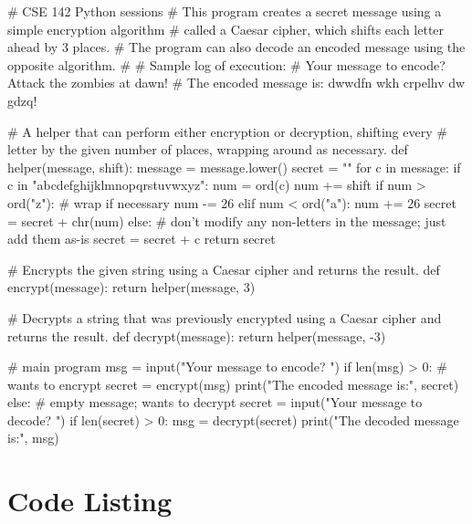 {\scriptsize
\begin{python}
# CSE 142 Python sessions
# This program creates a secret message using a simple encryption algorithm
# called a Caesar cipher, which shifts each letter ahead by 3 places.
# The program can also decode an encoded message using the opposite algorithm.
#
# Sample log of execution:
# Your message to encode? Attack the zombies at dawn!
# The encoded message is: dwwdfn wkh crpelhv dw gdzq!

# A helper that can perform either encryption or decryption, shifting every
# letter by the given number of places, wrapping around as necessary.
def helper(message, shift):
	message = message.lower()
	secret = ""
	for c in message:
		if c in "abcdefghijklmnopqrstuvwxyz":
			num = ord(c)
			num += shift
			if num > ord("z"):     # wrap if necessary
				num -= 26
			elif num < ord("a"):
				num += 26
			secret = secret + chr(num)
		else:
			# don't modify any non-letters in the message; just add them as-is
			secret = secret + c
	return secret

# Encrypts the given string using a Caesar cipher and returns the result.
def encrypt(message):
	return helper(message, 3)

# Decrypts a string that was previously encrypted using a Caesar cipher and returns the result.
def decrypt(message):
	return helper(message, -3)


# main program
msg = input("Your message to encode? ")
if len(msg) > 0:
	# wants to encrypt
	secret = encrypt(msg)
	print("The encoded message is:", secret)
else:
	# empty message; wants to decrypt
	secret = input("Your message to decode? ")
	if len(secret) > 0:
		msg = decrypt(secret)
		print("The decoded message is:", msg)

\end{python}
}

\pagebreak

\section{Code Listing}

